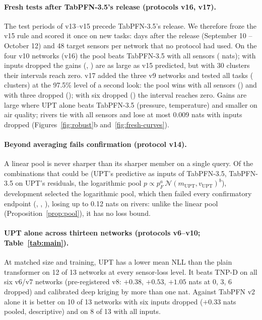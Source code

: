 \paragraph{Fresh tests after TabPFN-3.5's release (protocols v16, v17).} The test periods of v13--v15 precede
TabPFN-3.5's release. We therefore froze the v15 rule and scored it once on new tasks: days after the release
(September 10 -- October 12) and 48 target sensors per network that no protocol had used. On the four v10 networks
(v16) the pool beats TabPFN-3.5 with all sensors (\FOne{} nats); with inputs dropped the gains (\FTwoThree{},
\FTwoSix{}) are as large as v15 predicted, but with 30 clusters their intervals reach zero. v17 added the three v9
networks and tested all \GEpisodes{} tasks (\GClusters{} clusters) at the 97.5\% level of a second look: the pool wins
with all sensors (\GOne{}) and with three dropped (\GTwoThree{}); with six dropped (\GTwoSix{}) the interval reaches
zero. Gains are large where UPT alone beats TabPFN-3.5 (pressure, temperature) and smaller on air quality; rivers tie
with all sensors and lose at most 0.009 nats with inputs dropped (Figures~\ref{fig:robust}b and~\ref{fig:fresh-curves}).

\paragraph{Beyond averaging fails confirmation (protocol v14).} A linear pool is never sharper than its sharper member
on a single query. Of the combinations that could be (UPT's predictive as inputs of TabPFN-3.5, TabPFN-3.5 on UPT's
residuals, the logarithmic pool $p\propto p_F^a\,\mathcal N(m_{\mathrm{UPT}},v_{\mathrm{UPT}})^b$), development
selected the logarithmic pool, which then failed every confirmatory endpoint (\ROne{}, \RTwoThree{}, \RTwoSix{}),
losing up to 0.12 nats on rivers: unlike the linear pool (Proposition~\ref{prop:pool}), it has no loss bound.



\paragraph{UPT alone across thirteen networks (protocols v6--v10; Table~\ref{tab:main}).} At matched size and
training, UPT has a lower mean NLL than the plain transformer on 12 of 13 networks at every sensor-loss level. It
beats TNP-D on all six v6/v7 networks (pre-registered v8: $+0.38$, $+0.53$, $+1.05$ nats at 0, 3, 6 dropped) and
calibrated deep kriging by more than one nat. Against TabPFN v2 alone it is better on 10 of 13 networks with six
inputs dropped ($+0.33$ nats pooled, descriptive) and on 8 of 13 with all inputs.

